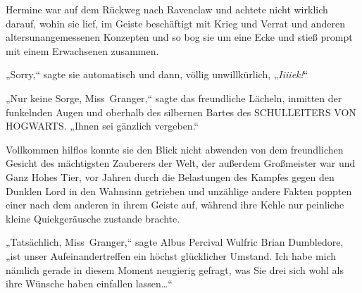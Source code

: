 \later

Hermine war auf dem Rückweg nach Ravenclaw und achtete nicht wirklich darauf, wohin sie lief, im Geiste beschäftigt mit Krieg und Verrat und anderen altersunangemessenen Konzepten und so bog sie um eine Ecke und stieß prompt mit einem Erwachsenen zusammen.

„Sorry,“ sagte sie automatisch und dann, völlig unwillkürlich, „\emph{Iiiiek!}“

„Nur keine Sorge, Miss~Granger,“ sagte das freundliche Lächeln, inmitten der funkelnden Augen und oberhalb des silbernen Bartes des SCHULLEITERS VON HOGWARTS. „Ihnen sei gänzlich vergeben.“

Vollkommen hilflos konnte sie den Blick nicht abwenden von dem freundlichen Gesicht des mächtigsten Zauberers der Welt, der außerdem Großmeister war und Ganz Hohes Tier, vor Jahren durch die Belastungen des Kampfes gegen den Dunklen Lord in den Wahnsinn getrieben und unzählige andere Fakten poppten einer nach dem anderen in ihrem Geiste auf, während ihre Kehle nur peinliche kleine Quiekgeräusche zustande brachte.

„Tatsächlich, Miss~Granger,“ sagte Albus Percival Wulfric Brian Dumbledore, „ist unser Aufeinandertreffen ein höchst glücklicher Umstand. Ich habe mich nämlich gerade in diesem Moment neugierig gefragt, was Sie drei sich wohl als ihre Wünsche haben einfallen lassen…“

\later

